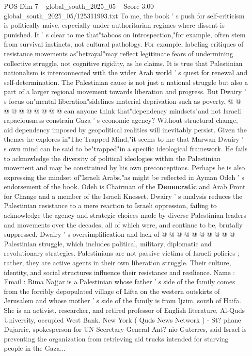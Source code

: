 \begin{textsample}{POS Dim 7 – global\_south\_2025\_05 – Score 3.00 – global\_south\_2025\_05/125311993.txt}
To me, the book ' s push for self-criticism is politically naive, especially under authoritarian regimes where dissent is punished.
It ' s clear to me that"taboos on introspection,"for example, often stem from survival instincts, not cultural pathology.
For example, labeling critiques of resistance movements as"betrayal"may reflect legitimate fears of undermining collective struggle, not cognitive rigidity, as he claims.
It is true that Palestinian nationalism is interconnected with the wider Arab world ' s quest for renewal and self-determination.
The Palestinian cause is not just a national struggle but also a part of a larger regional movement towards liberation and progress.
But Dwairy ' s focus on"mental liberation"sidelines material deprivation such as poverty, @ @ @ @ @ @ @ @ @ @ can anyone think that"dependency mindsets"and not Israeli rapaciousness constrain Gaza ' s economic agency?
Without structural change, aid dependency imposed by geopolitical realities will inevitably persist.
Given the themes he explores in"The Trapped Mind,"it seems to me that Marwan Dwairy ' s own mind can be said to be"trapped"in a specific ideological framework.
He fails to acknowledge the diversity of political ideologies within the Palestinian movement and may be constrained by his own preconceptions.
Perhaps he is also expressing the mindset of"Israeli Arabs,"as might be reflected in Ayman Odeh ' s endorsement of the book.
Odeh is Chairman of the \textbf{Democratic} and Arab Front for Change and a member of the Israeli Knesset.
Dwairy ' s analysis reduces the Palestinian resistance to a mere reaction to Israeli oppression, failing to acknowledge the agency and strategic choices made by diverse Palestinian leaders and movements over the decades, all of which were, and continue to be, brutally suppressed.
Dwairy ' s oversimplification and lack of @ @ @ @ @ @ @ @ @ @ Palestinian struggle, which includes political, military, diplomatic and revolutionary strategies.
Palestinians are not passive victims of Israeli policies ; rather, they are active agents in their own liberation struggle.
Their culture, identity, and social structures influence their resistance and resilience.
Name : Email : Rima Najjar is a Palestinian whose father ' s side of the family comes from the forcibly depopulated village of Lifta on the western outskirts of Jerusalem and whose mother ' s side of the family is from Ijzim, south of Haifa.
She is an activist, researcher, and retired professor of English literature, Al-Quds University, occupied West Bank.
New York ( Quds News Network ) - St? phane Dujarric, spokesperson for UN Secretary-General Ant? nio Guterres, said Israel is preventing the organization from retrieving aid trucks intended for starving people in the Gaza...

\end{textsample}
